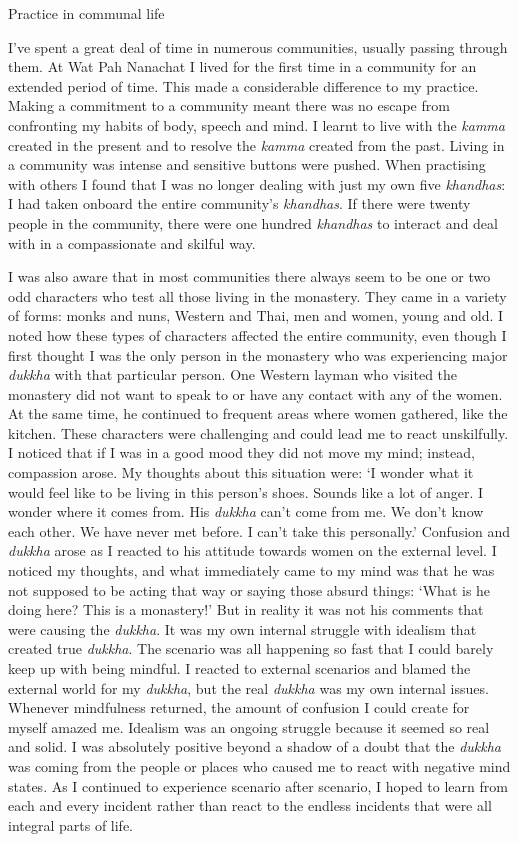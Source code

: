 Practice in communal life

I've spent a great deal of time in numerous communities, usually passing
through them. At Wat Pah Nanachat I lived for the first time in a
community for an extended period of time. This made a considerable
difference to my practice. Making a commitment to a community meant
there was no escape from confronting my habits of body, speech and mind.
I learnt to live with the \emph{kamma} created in the present and to
resolve the \emph{kamma} created from the past. Living in a community
was intense and sensitive buttons were pushed. When practising with
others I found that I was no longer dealing with just my own five
\emph{khandhas}: I had taken onboard the entire community's
\emph{khandhas}. If there were twenty people in the community, there
were one hundred \emph{khandhas} to interact and deal with in a
compassionate and skilful way.

I was also aware that in most communities there always seem to be one or
two odd characters who test all those living in the monastery. They came
in a variety of forms: monks and nuns, Western and Thai, men and women,
young and old. I noted how these types of characters affected the entire
community, even though I first thought I was the only person in the
monastery who was experiencing major \emph{dukkha} with that particular
person. One Western layman who visited the monastery did not want to
speak to or have any contact with any of the women. At the same time, he
continued to frequent areas where women gathered, like the kitchen.
These characters were challenging and could lead me to react
unskilfully. I noticed that if I was in a good mood they did not move my
mind; instead, compassion arose. My thoughts about this situation were:
`I wonder what it would feel like to be living in this person's shoes.
Sounds like a lot of anger. I wonder where it comes from. His
\emph{dukkha} can't come from me. We don't know each other. We have
never met before. I can't take this personally.' Confusion and
\emph{dukkha} arose as I reacted to his attitude towards women on the
external level. I noticed my thoughts, and what immediately came to my
mind was that he was not supposed to be acting that way or saying those
absurd things: `What is he doing here? This is a monastery!' But in
reality it was not his comments that were causing the \emph{dukkha}. It
was my own internal struggle with idealism that created true
\emph{dukkha}. The scenario was all happening so fast that I could
barely keep up with being mindful. I reacted to external scenarios and
blamed the external world for my \emph{dukkha}, but the real
\emph{dukkha} was my own internal issues. Whenever mindfulness returned,
the amount of confusion I could create for myself amazed me. Idealism
was an ongoing struggle because it seemed so real and solid. I was
absolutely positive beyond a shadow of a doubt that the \emph{dukkha}
was coming from the people or places who caused me to react with
negative mind states. As I continued to experience scenario after
scenario, I hoped to learn from each and every incident rather than
react to the endless incidents that were all integral parts of life.

